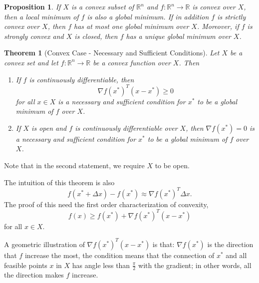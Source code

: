 \documentclass[12pt,a4paper]{article}
\numberwithin{equation}{section}
\theoremstyle{mystyle}
\newtheorem{theorem}[definition]{Theorem}
\newtheorem{proposition}[definition]{Proposition}
\newcommand{\R}{\mathbb{R}}
\newcommand{\grad}{\nabla}
\begin{document}
	\begin{proposition}
		If $X$ is a convex subset of $\R^n$ and $f:\R^n \to \R$ is convex over $X$, then a local minimum of $f$ is also a global minimum. If in addition $f$ is strictly convex over $X$, then $f$ has at most one global minimum over $X$. Moreover, if $f$ is strongly convex and $X$ is closed, then $f$ has a unique global minimum over $X$.
	\end{proposition}
	
	\begin{theorem}[Convex Case - Necessary and Sufficient Conditions]
		Let $X$ be a convex set and let $f:\R^n \to \R$ be a convex function over $X$. Then
		\begin{enumerate}
			\item If $f$ is continuously differentiable, then
			$$
			\grad f(x^*)^T(x-x^*)\geq 0
			$$
			for all $x\in X$ is a necessary and sufficient condition for $x^*$ to be a global minimum of $f$ over $X$.
			\item If $X$ is open and $f$ is continuously differentiable over $X$, then $\grad f(x^*)=0$ is a necessary and sufficient condition for $x^*$ to be a global minimum of $f$ over $X$.
		\end{enumerate}
	\end{theorem}
	Note that in the second statement, we require $X$ to be open.

	The intuition of this theorem is also
	$$
	f(x^*+\Delta x)-f(x^*)\approx \grad f(x^*)^T \Delta x.
	$$
	The proof of this need the first order characterization of convexity,
	$$
	f(x)\geq f(x^*) +\grad f(x^*)^T (x-x^*)
	$$
	for all $x\in X$.
	
	A geometric illustration of $\grad f(x^*)^T(x-x^*)$ is that: $\grad f(x^*)$ is the direction that $f$ increase the most, the condition means that the connection of $x^*$ and all feasible points $x$ in $X$ has angle less than $\frac{\pi}{2}$ with the gradient; in other words, all the direction makes $f$ increase.
	
\end{document}
